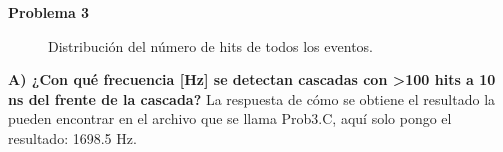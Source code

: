 \documentclass[11pt]{article}
\begin{document}
\textbf{Problema 3}
\begin{figure}[H]
\centering


\caption{Distribución del número de hits de todos los eventos.}
\end{figure}

\textbf{A) ¿Con qué frecuencia [Hz] se detectan cascadas con >100 hits a 10 ns del frente de la cascada?}
La respuesta de cómo se obtiene el resultado la pueden encontrar en el archivo que se llama Prob3.C, aquí solo pongo el resultado: 1698.5 Hz.
\end{document}
